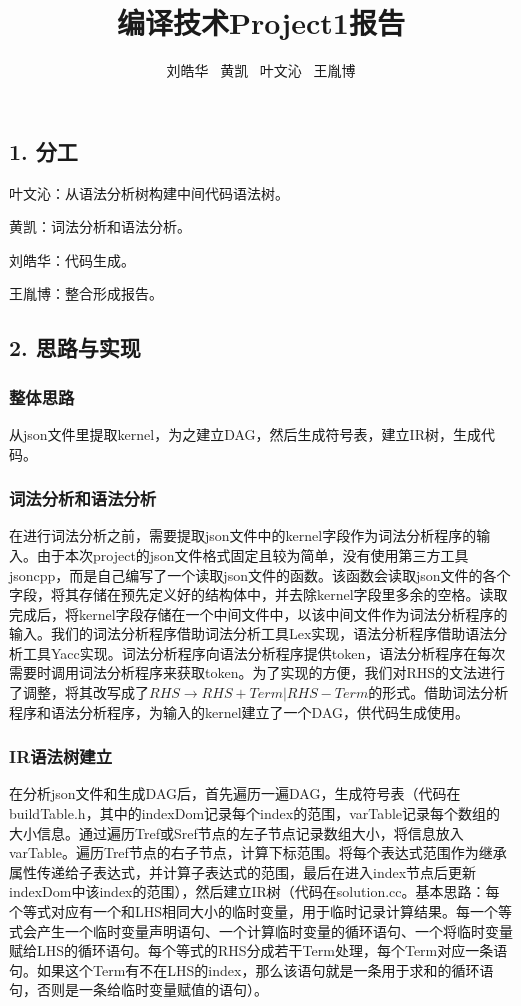 \documentclass[a4paper,11pt]{ctexart}
\title{编译技术Project1报告}
\author{刘皓华 ~黄凯 ~叶文沁 ~王胤博}
\date{ }
\begin{document}
\maketitle
\subsection*{1. 分工}
叶文沁：从语法分析树构建中间代码语法树。

黄凯：词法分析和语法分析。

刘皓华：代码生成。

王胤博：整合形成报告。
\subsection*{2. 思路与实现}
\subsubsection*{整体思路}

从json文件里提取kernel，为之建立DAG，然后生成符号表，建立IR树，生成代码。

\subsubsection*{词法分析和语法分析}

在进行词法分析之前，需要提取json文件中的kernel字段作为词法分析程序的输入。由于本次project的json文件格式固定且较为简单，没有使用第三方工具jsoncpp，而是自己编写了一个读取json文件的函数。该函数会读取json文件的各个字段，将其存储在预先定义好的结构体中，并去除kernel字段里多余的空格。读取完成后，将kernel字段存储在一个中间文件中，以该中间文件作为词法分析程序的输入。我们的词法分析程序借助词法分析工具Lex实现，语法分析程序借助语法分析工具Yacc实现。词法分析程序向语法分析程序提供token，语法分析程序在每次需要时调用词法分析程序来获取token。为了实现的方便，我们对RHS的文法进行了调整，将其改写成了$RHS\rightarrow RHS+Term|RHS-Term$的形式。借助词法分析程序和语法分析程序，为输入的kernel建立了一个DAG，供代码生成使用。

\subsubsection*{IR语法树建立}

在分析json文件和生成DAG后，首先遍历一遍DAG，生成符号表（代码在buildTable.h，其中的indexDom记录每个index的范围，varTable记录每个数组的大小信息。通过遍历Tref或Sref节点的左子节点记录数组大小，将信息放入varTable。遍历Tref节点的右子节点，计算下标范围。将每个表达式范围作为继承属性传递给子表达式，并计算子表达式的范围，最后在进入index节点后更新indexDom中该index的范围），然后建立IR树（代码在solution.cc。基本思路：每个等式对应有一个和LHS相同大小的临时变量，用于临时记录计算结果。每一个等式会产生一个临时变量声明语句、一个计算临时变量的循环语句、一个将临时变量赋给LHS的循环语句。每个等式的RHS分成若干Term处理，每个Term对应一条语句。如果这个Term有不在LHS的index，那么该语句就是一条用于求和的循环语句，否则是一条给临时变量赋值的语句）。
\end{document}
